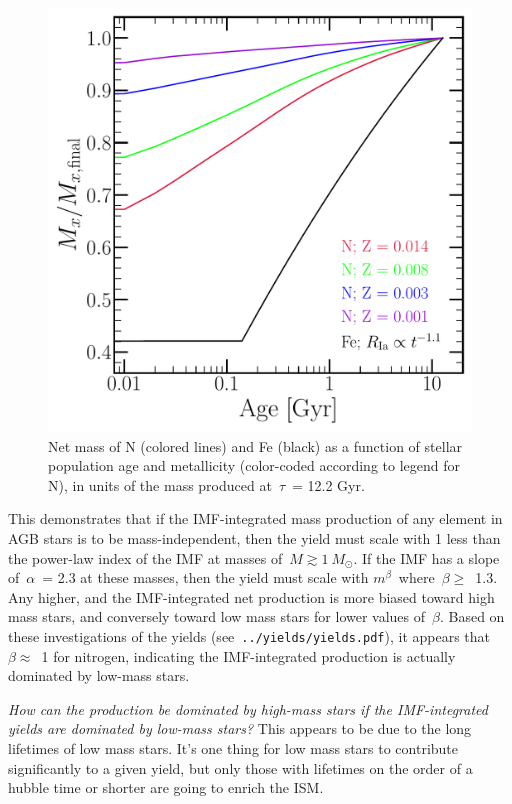 \documentclass[12pt]{report}
\newcommand\twolineskip{\par\noindent\null\par\noindent}
\begin{document}
\begin{figure}[t] 
\centering 
\includegraphics[scale = 0.5]{n_vs_fe_ssp.pdf} 
\caption{Net mass of N (colored lines) and Fe (black) as a function of stellar 
population age and metallicity (color-coded according to legend for N), in 
units of the mass produced at~$\tau$~= 12.2 Gyr. } 
\label{fig:n_vs_fe_ssp} 
\end{figure} 

This demonstrates that if the IMF-integrated mass production of any element in 
AGB stars is to be mass-independent, then the yield must scale with 1 less than 
the power-law index of the IMF at masses of~$M \gtrsim 1~M_\odot$. If the IMF 
has a slope of~$\alpha$~= 2.3 at these masses, then the yield must scale with 
$m^\beta$~where~$\beta \geq$~1.3. Any higher, and the IMF-integrated net 
production is more biased toward high mass stars, and conversely toward low 
mass stars for lower values of~$\beta$. Based on these investigations of the 
\citet{Cristallo2011} yields (see~\texttt{../yields/yields.pdf}), it appears 
that~$\beta \approx$~1 for nitrogen, indicating the IMF-integrated production 
is actually dominated by low-mass stars. 
\twolineskip 
{\Large \textit{How can the production be dominated by high-mass stars if the 
IMF-integrated yields are dominated by low-mass stars?}} 
This appears to be due to the long lifetimes of low mass stars. It's one thing 
for low mass stars to contribute significantly to a given yield, but only 
those with lifetimes on the order of a hubble time or shorter are going to 
enrich the ISM. 

\newpage 
 
 
\end{document}
